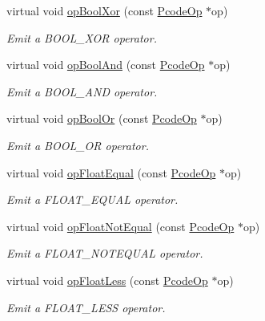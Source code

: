 \begin{DoxyCompactItemize}
\item 
virtual void \mbox{\hyperlink{class_print_c_a3b5013210b6200df98455c01cba37636}{op\+Bool\+Xor}} (const \mbox{\hyperlink{class_pcode_op}{Pcode\+Op}} $\ast$op)
\begin{DoxyCompactList}\small\item\em Emit a B\+O\+O\+L\+\_\+\+X\+OR operator. \end{DoxyCompactList}\item 
virtual void \mbox{\hyperlink{class_print_c_af238033b0aebde872f986043b141a9f2}{op\+Bool\+And}} (const \mbox{\hyperlink{class_pcode_op}{Pcode\+Op}} $\ast$op)
\begin{DoxyCompactList}\small\item\em Emit a B\+O\+O\+L\+\_\+\+A\+ND operator. \end{DoxyCompactList}\item 
virtual void \mbox{\hyperlink{class_print_c_aecfc193178d986a69d3b9ae7db1de6ed}{op\+Bool\+Or}} (const \mbox{\hyperlink{class_pcode_op}{Pcode\+Op}} $\ast$op)
\begin{DoxyCompactList}\small\item\em Emit a B\+O\+O\+L\+\_\+\+OR operator. \end{DoxyCompactList}\item 
virtual void \mbox{\hyperlink{class_print_c_a56af03e4793db92a146fb1b014a563a0}{op\+Float\+Equal}} (const \mbox{\hyperlink{class_pcode_op}{Pcode\+Op}} $\ast$op)
\begin{DoxyCompactList}\small\item\em Emit a F\+L\+O\+A\+T\+\_\+\+E\+Q\+U\+AL operator. \end{DoxyCompactList}\item 
virtual void \mbox{\hyperlink{class_print_c_ad3242b648f6bf515baccfb83c194e186}{op\+Float\+Not\+Equal}} (const \mbox{\hyperlink{class_pcode_op}{Pcode\+Op}} $\ast$op)
\begin{DoxyCompactList}\small\item\em Emit a F\+L\+O\+A\+T\+\_\+\+N\+O\+T\+E\+Q\+U\+AL operator. \end{DoxyCompactList}\item 
virtual void \mbox{\hyperlink{class_print_c_af7ce33437e0a4e1b82bbd8c5cf094ee0}{op\+Float\+Less}} (const \mbox{\hyperlink{class_pcode_op}{Pcode\+Op}} $\ast$op)
\begin{DoxyCompactList}\small\item\em Emit a F\+L\+O\+A\+T\+\_\+\+L\+E\+SS operator. \end{DoxyCompactList}\item 

\end{DoxyCompactItemize}
